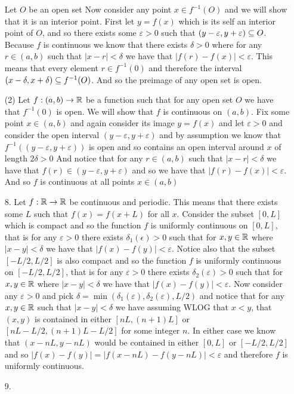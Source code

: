 \documentclass[12pt]{amsart}
\begin{document}
\begin{itemize}
               Let $O$ be an open set%
               Now consider any point $x\in f^{-1}(O)$ and we will show that it is an interior point. First let $y=f(x)$
               which is its self an interior point of $O$, and so there exists some $\varepsilon>0$ 
               such that $(y-\varepsilon, y+\varepsilon)\subseteq O$. Because $f$ is continuous we know that there exists $\delta>0$ 
               where for any $r\in (a,b)$ such that $|x-r|<\delta$ we have that $|f(r)-f(x)|<\varepsilon$. This means that every element $r\in f^{-1}(0)$
               and therefore the interval $(x-\delta,x+\delta)\subseteq f^{-1}(O)$. And so the preimage of any open set is open.
               

               (2) Let $f:(a,b)\rightarrow\mathbb{R}$ be a function such that for any open set $O$ we have that $f^{-1}(0)$ is open.
               We will show that $f$ is continuous on $(a,b)$. Fix some point $x\in (a,b)$ and again consider its image $y=f(x)$ and let 
               $\varepsilon>0$ and consider the open interval $(y-\varepsilon, y+\varepsilon)$ and by assumption we know that 
               $f^{-1}((y-\varepsilon, y+\varepsilon))$ is open and so contains an open interval around $x$ of length $2\delta>0$
               And notice that for any $r\in (a,b)$ such that $|x-r|<\delta$ we have that $f(r)\in(y-\varepsilon, y+\varepsilon)$ and so
               we have that $|f(r)-f(x)|<\varepsilon$. And so $f$ is continuous at all points $x\in(a,b)$


    \item[8.] Let $f:\mathbb{R}\rightarrow \mathbb{R}$ be continuous and periodic. This means that there exists some $L$ such that $f(x)=f(x+L)$ for all $x$. 
    Consider the subset $[0,L]$ which is compact and so the function $f$ is uniformly continuous on $[0,L]$, that is for any 
    $\varepsilon>0$ there exists $\delta_1(\epsilon)>0$ such that for $x,y\in\mathbb{R}$ where $|x-y|<\delta$ we have that $|f(x)-f(y)|<\varepsilon$.
    Notice also that the subset $[-L/2,L/2]$ is also compact and so the function $f$ is uniformly continuous on $[-L/2,L/2]$, that is for any 
    $\varepsilon>0$ there exists $\delta_2(\varepsilon)>0$ such that for $x,y\in\mathbb{R}$ where $|x-y|<\delta$ we have that $|f(x)-f(y)|<\varepsilon$. 
    Now consider any $\varepsilon >0$ and pick $\delta=\min(\delta_1(\varepsilon),\delta_2(\varepsilon), L/2)$ and notice that for any $x,y\in\mathbb{R}$ such that $|x-y|<\delta$
    we have assuming WLOG that $x<y$, that $(x,y)$ is contained in either $[nL,(n+1)L]$ or $[nL-L/2,(n+1)L-L/2]$ for some integer $n$. 
    In either case we know that $(x-nL,y-nL)$ would be contained in either $[0,L]$ or $[-L/2,L/2]$ and so $|f(x)-f(y)|=|f(x-nL)-f(y-nL)|<\varepsilon$ and therefore 
    $f$ is uniformly continuous.


    \item[9.]

\end{itemize}
\end{document}

